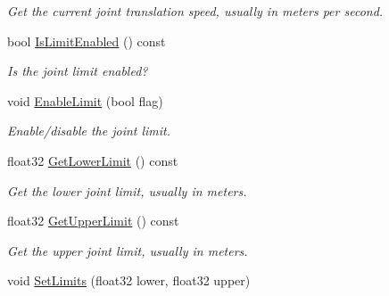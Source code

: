 \begin{DoxyCompactItemize}
\begin{DoxyCompactList}\small\item\em Get the current joint translation speed, usually in meters per second. \end{DoxyCompactList}\item 
bool \hyperlink{classb2_prismatic_joint_afb109fd7f3efbf44eae4b7961169bf9f}{Is\+Limit\+Enabled} () const \hypertarget{classb2_prismatic_joint_afb109fd7f3efbf44eae4b7961169bf9f}{}\label{classb2_prismatic_joint_afb109fd7f3efbf44eae4b7961169bf9f}

\begin{DoxyCompactList}\small\item\em Is the joint limit enabled? \end{DoxyCompactList}\item 
void \hyperlink{classb2_prismatic_joint_a6d419afe7bd4b0e36d2e4607df7f79f2}{Enable\+Limit} (bool flag)\hypertarget{classb2_prismatic_joint_a6d419afe7bd4b0e36d2e4607df7f79f2}{}\label{classb2_prismatic_joint_a6d419afe7bd4b0e36d2e4607df7f79f2}

\begin{DoxyCompactList}\small\item\em Enable/disable the joint limit. \end{DoxyCompactList}\item 
float32 \hyperlink{classb2_prismatic_joint_ad58727abc63a820e6d93983408a9508b}{Get\+Lower\+Limit} () const \hypertarget{classb2_prismatic_joint_ad58727abc63a820e6d93983408a9508b}{}\label{classb2_prismatic_joint_ad58727abc63a820e6d93983408a9508b}

\begin{DoxyCompactList}\small\item\em Get the lower joint limit, usually in meters. \end{DoxyCompactList}\item 
float32 \hyperlink{classb2_prismatic_joint_ac72bdcf5108d474d3f11e86773a9a471}{Get\+Upper\+Limit} () const \hypertarget{classb2_prismatic_joint_ac72bdcf5108d474d3f11e86773a9a471}{}\label{classb2_prismatic_joint_ac72bdcf5108d474d3f11e86773a9a471}

\begin{DoxyCompactList}\small\item\em Get the upper joint limit, usually in meters. \end{DoxyCompactList}\item 
void \hyperlink{classb2_prismatic_joint_a82a220e6d5a212c1924882e0855b0bef}{Set\+Limits} (float32 lower, float32 upper)\hypertarget{classb2_prismatic_joint_a82a220e6d5a212c1924882e0855b0bef}{}\label{classb2_prismatic_joint_a82a220e6d5a212c1924882e0855b0bef}


\end{DoxyCompactItemize}
